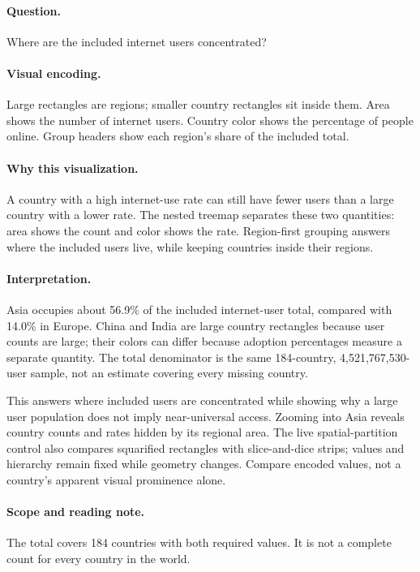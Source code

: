 \documentclass[conference,a4paper]{IEEEtran}
\begin{document}
\paragraph{Question.} Where are the included internet users concentrated?



\paragraph{Visual encoding.} Large rectangles are regions; smaller country rectangles sit inside them. Area shows the number of internet users. Country color shows the percentage of people online. Group headers show each region's share of the included total.



\paragraph{Why this visualization.} A country with a high internet-use rate can still have fewer users than a large country with a lower rate. The nested treemap separates these two quantities: area shows the count and color shows the rate. Region-first grouping answers where the included users live, while keeping countries inside their regions.



\paragraph{Interpretation.} Asia occupies about 56.9\% of the included internet-user total, compared with 14.0\% in Europe. China and India are large country rectangles because user counts are large; their colors can differ because adoption percentages measure a separate quantity. The total denominator is the same 184-country, 4,521,767,530-user sample, not an estimate covering every missing country.

This answers where included users are concentrated while showing why a large user population does not imply near-universal access. Zooming into Asia reveals country counts and rates hidden by its regional area. The live spatial-partition control also compares squarified rectangles with slice-and-dice strips; values and hierarchy remain fixed while geometry changes. Compare encoded values, not a country's apparent visual prominence alone.



\paragraph{Scope and reading note.} The total covers 184 countries with both required values. It is not a complete count for every country in the world.
\end{document}
